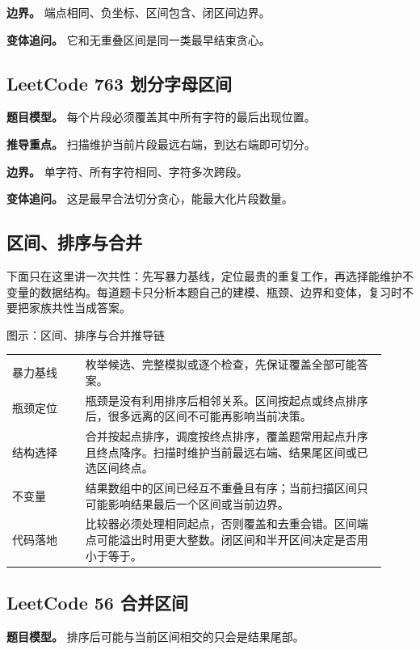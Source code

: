 \textbf{边界。} 端点相同、负坐标、区间包含、闭区间边界。

\textbf{变体追问。} 它和无重叠区间是同一类最早结束贪心。

\subsection{LeetCode 763 划分字母区间}

\textbf{题目模型。} 每个片段必须覆盖其中所有字符的最后出现位置。

\textbf{推导重点。} 扫描维护当前片段最远右端，到达右端即可切分。

\textbf{边界。} 单字符、所有字符相同、字符多次跨段。

\textbf{变体追问。} 这是最早合法切分贪心，能最大化片段数量。

\subsection{区间、排序与合并}
下面只在这里讲一次共性：先写暴力基线，定位最贵的重复工作，再选择能维护不变量的数据结构。每道题卡只分析本题自己的建模、瓶颈、边界和变体，复习时不要把家族共性当成答案。

\begin{principlebox}{图示：区间、排序与合并推导链}
\begin{tabular}{@{}p{0.18\linewidth}p{0.74\linewidth}@{}}
暴力基线 & 枚举候选、完整模拟或逐个检查，先保证覆盖全部可能答案。\\
瓶颈定位 & 瓶颈是没有利用排序后相邻关系。区间按起点或终点排序后，很多远离的区间不可能再影响当前决策。\\
结构选择 & 合并按起点排序，调度按终点排序，覆盖题常用起点升序且终点降序。扫描时维护当前最远右端、结果尾区间或已选区间终点。\\
不变量 & 结果数组中的区间已经互不重叠且有序；当前扫描区间只可能影响结果最后一个区间或当前边界。\\
代码落地 & 比较器必须处理相同起点，否则覆盖和去重会错。区间端点可能溢出时用更大整数。闭区间和半开区间决定是否用小于等于。\\
\end{tabular}
\end{principlebox}

\subsection{LeetCode 56 合并区间}

\textbf{题目模型。} 排序后可能与当前区间相交的只会是结果尾部。

